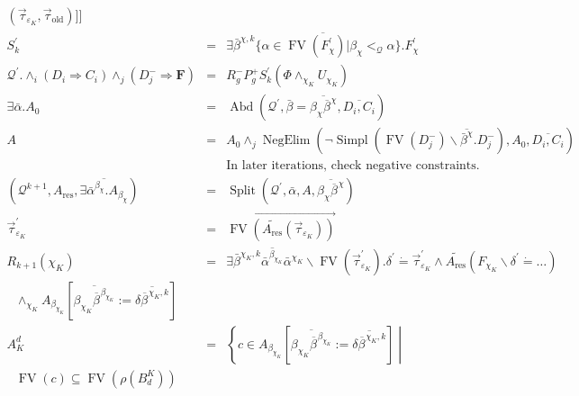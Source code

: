 \documentclass{article}
\newcommand{\assign}{:=}
\newcommand{\tmmathbf}[1]{\ensuremath{\boldsymbol{#1}}}
\newcommand{\tmop}[1]{\ensuremath{\operatorname{#1}}}
\begin{document}
\begin{table}[t]
\begin{eqnarray}
    (\vec{\tau}_{\varepsilon_K}, \vec{\tau}_{\tmop{old}})]] \nonumber\\
    S_k^{\prime} & = & \overline{\exists \bar{\beta}^{\chi, k} \{ \alpha \in
    \tmop{FV} (F^{\prime}_{\chi}) | \beta_{\chi} <_{\mathcal{Q}} \alpha \}
    .F^{\prime}_{\chi}^{}} \nonumber\\
    \mathcal{Q}^{\prime} . \wedge_i (D_i \Rightarrow C_i) \wedge_j (D_j^-
    \Rightarrow \tmmathbf{F}) & = & R_g^- P_g^+ S_k^{\prime} (\Phi
    \wedge_{\chi_K} U_{\chi_K})  \label{MainAlgEnt3}\\
    \exists \bar{\alpha} .A_0 & = & \tmop{Abd} \left( \mathcal{Q}^{\prime},
    \bar{\beta} = \overline{\beta_{\chi} \overline{\beta^{}}^{\chi}},
    \overline{D_i, C_i} \right)  \label{MainAlgEnt4}\\
    A & = & A_0 \wedge_j \tmop{NegElim} (\neg \tmop{Simpl} (\tmop{FV} (D_j^-)
    \backslash \overline{\bar{\beta}^{\chi}} .D_j^-), A_0, \overline{D_i,
    C_i}) \nonumber\\
    &  & \text{In later iterations, check negative constraints.} \nonumber\\
    \left( \mathcal{Q}^{k + 1}, A_{\tmop{res}}, \overline{\exists
    \bar{\alpha}^{\beta_{\chi}} .A_{\beta_{\chi}}} \right) & = & \tmop{Split}
    \left( \mathcal{Q}^{\prime}, \bar{\alpha}, A, \overline{\beta_{\chi}
    \overline{\beta^{}}^{\chi}} \right)  \label{MainAlgEnt5}\\
    \vec{\tau}_{\varepsilon_K}^{\prime} & = & \overrightarrow{\tmop{FV}
    (\widetilde{A_{\tmop{res}}} (\vec{\tau}_{\varepsilon_K}))} \nonumber\\
    R_{k + 1} (\chi_K) & = & \exists \bar{\beta}^{\chi_K, k}
    \overline{\bar{\alpha}^{\beta_{\chi_K}}} \bar{\alpha}^{\chi_K} \backslash
    \tmop{FV} (\vec{\tau}_{\varepsilon_K}^{\prime}) . \delta^{\prime} \dot{=}
    \vec{\tau}_{\varepsilon_K}^{\prime} \wedge \widetilde{A_{\tmop{res}}}
    (F_{\chi_K} \backslash \delta^{\prime} \dot{=} \ldots) \\
    \text{ \ \ \ } \wedge_{\chi_K} A_{\beta_{\chi_K}} \left[
    \overline{\beta_{\chi_K} \overline{\beta^{}}^{\beta_{\chi_K}}} \assign
    \overline{\delta \overline{\beta^{}}^{\chi_K, k}} \right] 
    \label{MainAlgEnt6}\\
    A_K^d & = & \left\{ c \in A_{\beta_{\chi_K}} \left[
    \overline{\beta_{\chi_K} \overline{\beta^{}}^{\beta_{\chi_K}}} \assign
    \overline{\delta \overline{\beta^{}}^{\chi_K, k}} \right] \middle| \\
    \text{ \ \ \ \ \ } \tmop{FV} (c) \subseteq \tmop{FV} (\rho (B_d^K))

\end{eqnarray}
\end{table}
\end{document}
